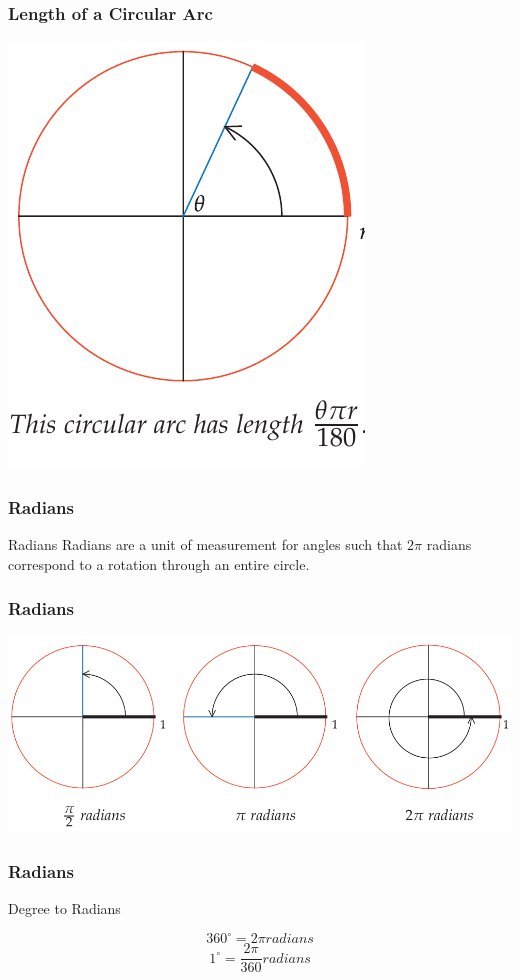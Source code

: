\documentclass{beamer}
\begin{document}
    
    \begin{frame}
        \frametitle{Length of a Circular Arc}
        \centering
        \includegraphics[scale=0.5]{5.png}
    \end{frame}
    
    \begin{frame}
        \frametitle{Radians}
       \begin{block}{Radians}
        Radians are a unit of measurement for angles such that $2\pi$ radians correspond
        to a rotation through an entire circle.
       \end{block}
    \end{frame}
    
    \begin{frame}
        \frametitle{Radians}
        \centering
        \includegraphics[scale=0.3]{6.png}
    \end{frame}
    \begin{frame}
        \frametitle{Radians}
       \begin{block}{Degree to Radians}
    
        $$ 360^{\circ} = 2 \pi radians $$
        $$ 1 ^{\circ}  = \frac{2 \pi}{360} radians $$
        
       \end{block}
    \end{frame}
    
\end{document}
